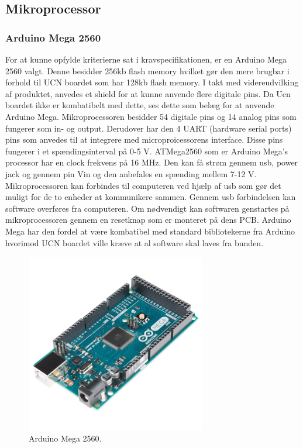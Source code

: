 \subsection{Mikroprocessor}
\subsubsection{Arduino Mega 2560}
For at kunne opfylde kriterierne sat i kravspecifikationen, er en Arduino Mega 2560 valgt. Denne besidder 256kb flash memory hvilket gør den mere brugbar i forhold til UCN boardet som har 128kb flash memory. \newline I takt med videreudvilking af produktet, anvedes et shield for at kunne anvende flere digitale pins. Da Ucn boardet ikke er kombatibelt med dette, ses dette som belæg for at anvende Arduino Mega. \newline
Mikroprocessoren besidder 54 digitale pins og 14 analog pins som fungerer som in- og output. Derudover har den 4 UART (hardware serial ports) pins som anvedes til at integrere med microproicessorens interface. Disse pins fungerer i et spændingsinterval på 0-5 V. \newline ATMega2560 som er Arduino Mega's processor har en clock frekvens på 16 MHz. Den kan få strøm gennem usb, power jack og gennem pin Vin og den anbefales en spænding mellem 7-12 V. \newline
Mikroprocessoren kan forbindes til computeren ved hjælp af usb som gør det muligt for de to enheder at kommunikere sammen. Gennem usb forbindelsen kan software overføres fra computeren. Om nødvendigt kan softwaren genstartes på mikroprocessoren gennem en resetknap som er monteret på dens PCB.\newline 
Arduino Mega har den fordel at være kombatibel med standard bibliotekerne fra Arduino hvorimod UCN boardet ville kræve at al software skal laves fra bunden.

\begin{figure}[h!]
  \centering
  \includegraphics[width=0.7\textwidth]{figures/arduinoMega.jpg}
  \caption{Arduino Mega 2560.}
  \label{tempgraf_eksempel1}
\end{figure} 


\newpage



